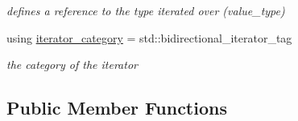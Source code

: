 \begin{DoxyCompactItemize}
\begin{DoxyCompactList}\small\item\em defines a reference to the type iterated over (value\+\_\+type) \end{DoxyCompactList}\item 
using \hyperlink{classnlohmann_1_1basic__json_1_1iter__impl_adbe1b700b9cdc38f6991fc68683a9c2c}{iterator\+\_\+category} = std\+::bidirectional\+\_\+iterator\+\_\+tag
\begin{DoxyCompactList}\small\item\em the category of the iterator \end{DoxyCompactList}\end{DoxyCompactItemize}
\subsection*{Public Member Functions}
